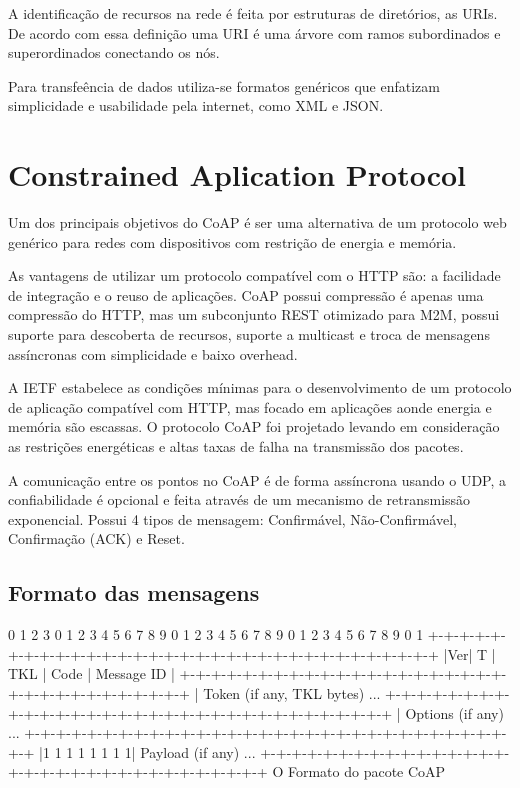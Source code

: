 A identifica\c{c}\~ao de recursos na rede \'e feita por estruturas de diret\'orios, as URIs. De acordo com essa defini\c{c}\~ao uma URI \'e uma \'arvore com ramos subordinados e superordinados conectando os n\'os.

Para transfe\^encia de dados utiliza-se formatos gen\'ericos que enfatizam simplicidade e usabilidade pela internet, como XML e JSON.

\section{Constrained Aplication Protocol}

Um dos principais objetivos do CoAP \'e ser uma alternativa de um protocolo web gen\'erico para redes com dispositivos com restri\c{c}\~ao de energia e mem\'oria.

As vantagens de utilizar um protocolo compat\'ivel com o HTTP s\~ao: a facilidade de integra\c{c}\~ao e o reuso de aplica\c{c}\~oes. CoAP possui compress\~ao \'e apenas uma compress\~ao do HTTP, mas um subconjunto REST otimizado para M2M, possui suporte para descoberta de recursos, suporte a multicast e troca de mensagens ass\'incronas com simplicidade e baixo overhead.

A IETF estabelece as condi\c{c}\~oes m\'inimas para o desenvolvimento de um protocolo de aplica\c{c}\~ao compat\'ivel com HTTP, mas focado em aplica\c{c}\~oes aonde energia e mem\'oria s\~ao escassas. O protocolo CoAP foi projetado levando em considera\c{c}\~ao as restri\c{c}\~oes energ\'eticas e altas taxas de falha na transmiss\~ao dos pacotes.

A comunica\c{c}\~ao entre os pontos no CoAP \'e de forma ass\'incrona usando o UDP, a confiabilidade \'e opcional e feita atrav\'es de um mecanismo de retransmiss\~ao exponencial. Possui 4 tipos de mensagem: Confirm\'avel, N\~ao-Confirm\'avel, Confirma\c{c}\~ao (ACK) e Reset.

\subsection{Formato das mensagens}

     0                   1                   2                   3
    0 1 2 3 4 5 6 7 8 9 0 1 2 3 4 5 6 7 8 9 0 1 2 3 4 5 6 7 8 9 0 1
   +-+-+-+-+-+-+-+-+-+-+-+-+-+-+-+-+-+-+-+-+-+-+-+-+-+-+-+-+-+-+-+-+
   |Ver| T |  TKL  |      Code     |          Message ID           |
   +-+-+-+-+-+-+-+-+-+-+-+-+-+-+-+-+-+-+-+-+-+-+-+-+-+-+-+-+-+-+-+-+
   |   Token (if any, TKL bytes) ...
   +-+-+-+-+-+-+-+-+-+-+-+-+-+-+-+-+-+-+-+-+-+-+-+-+-+-+-+-+-+-+-+-+
   |   Options (if any) ...
   +-+-+-+-+-+-+-+-+-+-+-+-+-+-+-+-+-+-+-+-+-+-+-+-+-+-+-+-+-+-+-+-+
   |1 1 1 1 1 1 1 1|    Payload (if any) ...
   +-+-+-+-+-+-+-+-+-+-+-+-+-+-+-+-+-+-+-+-+-+-+-+-+-+-+-+-+-+-+-+-+
   O Formato do pacote CoAP  \cite{draft-ietf-core-coap-18}


